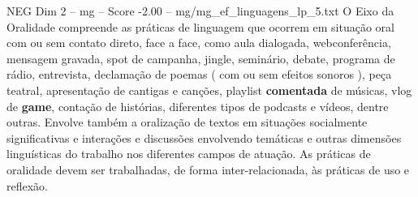 \begin{textsample}{NEG Dim 2 – mg – Score -2.00 – mg/mg\_ef\_linguagens\_lp\_5.txt}
O Eixo da Oralidade compreende as práticas de linguagem que ocorrem em situação oral com ou sem contato direto, face a face, como aula dialogada, webconferência, mensagem gravada, spot de campanha, jingle, seminário, debate, programa de rádio, entrevista, declamação de poemas ( com ou sem efeitos sonoros ), peça teatral, apresentação de cantigas e canções, playlist \textbf{comentada} de músicas, vlog de \textbf{game}, contação de histórias, diferentes tipos de podcasts e vídeos, dentre outras.
Envolve também a oralização de textos em situações socialmente significativas e interações e discussões envolvendo temáticas e outras dimensões linguísticas do trabalho nos diferentes campos de atuação.
As práticas de oralidade devem ser trabalhadas, de forma inter-relacionada, às práticas de uso e reflexão.

\end{textsample}
